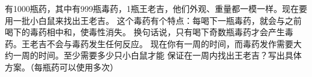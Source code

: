 \vspace{6pt} \par
有1000瓶药，其中有999瓶毒药，1瓶王老吉，他们外观、重量都一模一样。现在要用一批小白鼠来找出王老吉。
这个毒药有个特点：每喝下一瓶毒药，就会与之前喝下的毒药相中和，使毒性消失。
换句话说，只有喝下奇数瓶毒药才会产生毒药。王老吉不会与毒药发生任何反应。
现在你有一周的时间，而毒药发作需要大约一周的时间。至少需要多少只小白鼠才能
保证在一周内找出王老吉？写出具体方案。（每瓶药可以使用多次）
